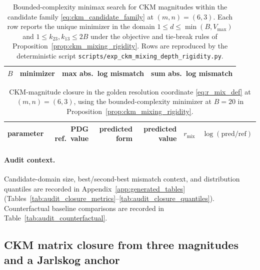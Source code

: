 \begin{table}[t]
\centering
\small
\setlength{\tabcolsep}{6pt}
\renewcommand{\arraystretch}{1.15}
\begin{tabular}{rllr}
\toprule
$B$ & minimizer & max abs.\ log mismatch & sum abs.\ log mismatch \\
\midrule
%
\end{tabular}
\caption{Bounded-complexity minimax search for CKM magnitudes within the candidate family \eqref{eq:ckm_candidate_family} at $(m,n)=(6,3)$. Each row reports the unique minimizer in the domain $1\le d\le\min(B,V_{\max})$ and $1\le k_{23},k_{13}\le 2B$ under the objective and tie-break rules of Proposition~\ref{prop:ckm_mixing_rigidity}. Rows are reproduced by the deterministic script \texttt{scripts/exp\_ckm\_mixing\_depth\_rigidity.py}.}
\label{tab:ckm_mixing_rigidity}
\end{table}

\begin{table}[t]
\centering
\small
\setlength{\tabcolsep}{6pt}
\renewcommand{\arraystretch}{1.15}
\begin{tabular}{lrrrrr}
\toprule
parameter & PDG ref.\ value & predicted form & predicted value & $r_{\mathrm{mix}}$ & $\log(\mathrm{pred}/\mathrm{ref})$ \\
\midrule
%
\end{tabular}
\caption{CKM-magnitude closure in the golden resolution coordinate \eqref{eq:r_mix_def} at $(m,n)=(6,3)$, using the bounded-complexity minimizer at $B=20$ in Proposition~\ref{prop:ckm_mixing_rigidity}.}
\label{tab:ckm_mixing}
\end{table}

\paragraph{Audit context.}
Candidate-domain size, best/second-best mismatch context, and distribution quantiles are recorded in Appendix~\ref{app:generated_tables} (Tables~\ref{tab:audit_closure_metrics}--\ref{tab:audit_closure_quantiles}).
Counterfactual baseline comparisons are recorded in Table~\ref{tab:audit_counterfactual}.

\subsection{CKM matrix closure from three magnitudes and a Jarlskog anchor}
\label{subsec:ckm_matrix_closure}

